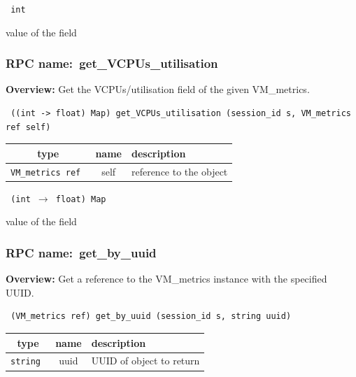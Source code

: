\vspace{0.3cm}

{\tt 
int
}


value of the field
\vspace{0.3cm}
\vspace{0.3cm}
\vspace{0.3cm}
\subsubsection{RPC name:~get\_VCPUs\_utilisation}

{\bf Overview:} 
Get the VCPUs/utilisation field of the given VM\_metrics.

\begin{verbatim} ((int -> float) Map) get_VCPUs_utilisation (session_id s, VM_metrics ref self)\end{verbatim}



 
\vspace{0.3cm}
\begin{tabular}{|c|c|p{7cm}|}
 \hline
{\bf type} & {\bf name} & {\bf description} \\ \hline
{\tt VM\_metrics ref } & self & reference to the object \\ \hline 

\end{tabular}

\vspace{0.3cm}

{\tt 
(int $\rightarrow$ float) Map
}


value of the field
\vspace{0.3cm}
\vspace{0.3cm}
\vspace{0.3cm}
\subsubsection{RPC name:~get\_by\_uuid}

{\bf Overview:} 
Get a reference to the VM\_metrics instance with the specified UUID.

\begin{verbatim} (VM_metrics ref) get_by_uuid (session_id s, string uuid)\end{verbatim}



 
\vspace{0.3cm}
\begin{tabular}{|c|c|p{7cm}|}
 \hline
{\bf type} & {\bf name} & {\bf description} \\ \hline
{\tt string } & uuid & UUID of object to return \\ \hline 

\end{tabular}


